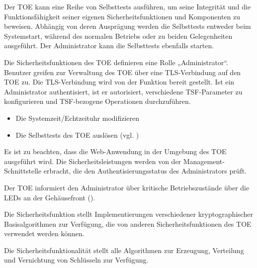
Der TOE kann eine Reihe von Selbsttests ausführen, um seine
Integrität und die Funktionsfähigkeit seiner eigenen
Sicherheitsfunktionen und Komponenten zu beweisen. Abhängig von deren
Ausprägung werden die Selbsttests entweder beim Systemstart, während
des normalen Betriebs oder zu beiden Gelegenheiten ausgeführt. Der
Administrator kann die Selbsttests ebenfalls starten.




Die Sicherheitsfunktionen des TOE definieren eine Rolle „Administrator“.
Benutzer greifen zur Verwaltung des TOE über eine TLS-Verbindung auf den TOE zu.
Die TLS-Verbindung wird von der Funktion
 bereit gestellt. Ist ein Administrator
authentisiert, ist er autorisiert, verschiedene TSF-Parameter zu konfigurieren
und TSF-bezogene Operationen durchzuführen.

\begin{itemize}
\item Die Systemzeit/Echtzeituhr modifizieren
\item Die Selbsttests des TOE auslösen (vgl. )
\end{itemize}

Es ist zu beachten, dass die Web-Anwendung in der Umgebung des TOE
ausgeführt wird. Die Sicherheitsleistungen werden von der
Management-Schnittstelle erbracht, die den Authentisierungsstatus des
Administrators prüft.

Der TOE informiert den Administrator über kritische Betriebszustände über die
LEDs an der Gehäusefront ().



Die Sicherheitsfunktion  stellt
Implementierungen verschiedener kryptographischer Basisalgorithmen zur
Verfügung, die von anderen Sicherheitsfunktionen des TOE verwendet werden
können.


Die Sicherheitsfunktionalität stellt alle Algorithmen zur Erzeugung, Verteilung
und Vernichtung von Schlüsseln zur Verfügung.


